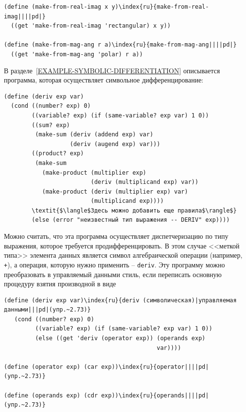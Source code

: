 \begin{Verbatim}[fontsize=\small]
(define (make-from-real-imag x y)\index{ru}{make-from-real-imag||||pd|}
  ((get 'make-from-real-imag 'rectangular) x y))

(define (make-from-mag-ang r a)\index{ru}{make-from-mag-ang||||pd|}
  ((get 'make-from-mag-ang 'polar) r a))
\end{Verbatim}
\begin{exercise}{2.73}\label{EX2.73}%
В 
разделе~\ref{EXAMPLE-SYMBOLIC-DIFFERENTIATION} описывается
программа, которая осуществляет 
%
%
символьное дифференцирование:

\begin{Verbatim}[fontsize=\small]
(define (deriv exp var) 
  (cond ((number? exp) 0)
        ((variable? exp) (if (same-variable? exp var) 1 0))
        ((sum? exp)
         (make-sum (deriv (addend exp) var)
                   (deriv (augend exp) var)))
        ((product? exp)
         (make-sum
           (make-product (multiplier exp)
                         (deriv (multiplicand exp) var))
           (make-product (deriv (multiplier exp) var)
                         (multiplicand exp))))
        \textit{$\langle$Здесь можно добавить еще правила$\rangle$}
        (else (error "неизвестный тип выражения -- DERIV" exp))))
\end{Verbatim}
Можно считать, что эта программа осуществляет диспетчеризацию по типу
выражения, которое требуется продифференцировать.  В этом случае
<<меткой типа>> элемента данных является символ алгебраической операции
(например, {\tt +}), а операция, которую нужно применить --
{\tt deriv}.  Эту программу можно преобразовать в управляемый
данными стиль, если переписать основную процедуру взятия производной в
виде

\begin{Verbatim}[fontsize=\small]
(define (deriv exp var)\index{ru}{deriv (символическая)|управляемая данными|||pd|(упр.~2.73)}
   (cond ((number? exp) 0)
         ((variable? exp) (if (same-variable? exp var) 1 0))
         (else ((get 'deriv (operator exp)) (operands exp)
                                            var))))

(define (operator exp) (car exp))\index{ru}{operator||||pd|(упр.~2.73)}

(define (operands exp) (cdr exp))\index{ru}{operands||||pd|(упр.~2.73)}
\end{Verbatim}


\end{exercise}
